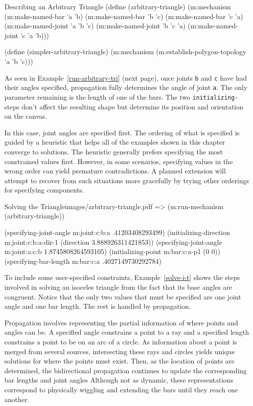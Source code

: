 \begin{code-example}
[label=arbitrary-tri]
{Describing an Arbitrary Triangle}
(define (arbitrary-triangle)
  (m:mechanism
   (m:make-named-bar 'a 'b)
   (m:make-named-bar 'b 'c)
   (m:make-named-bar 'c 'a)
   (m:make-named-joint 'a 'b 'c)
   (m:make-named-joint 'b 'c 'a)
   (m:make-named-joint 'c 'a 'b)))

(define (simpler-arbitrary-triangle)
  (m:mechanism
   (m:establish-polygon-topology 'a 'b 'c)))
\end{code-example}

As seen in Example~\ref{run-arbitrary-tri} (next page), once joints
\texttt{b} and \texttt{c} have had their angles specified, propagation
fully determines the angle of joint \texttt{a}.  The only parameter
remaining is the length of one of the bars.  The two
\texttt{initializing-} steps don't affect the resulting shape but
determine its position and orientation on the canvas.

In this case, joint angles are specified first. The ordering of what
is specified is guided by a heuristic that helps all of the examples
shown in this chapter converge to solutions. The heuristic generally
prefers specifying the most constrained values first. However, in some
scenarios, specifying values in the wrong order can yield premature
contradictions. A planned extension will attempt to recover from such
situations more gracefully by trying other orderings for specifying
components.

\begin{pdf-example}
[label=run-arbitrary-tri]
{Solving the Triangle}{images/arbitrary-triangle.pdf}
=> (m:run-mechanism (arbitrary-triangle))

(specifying-joint-angle m:joint:c:b:a .41203408293499)
(initializing-direction m:joint:c:b:a-dir-1 (direction 3.888926311421853))
(specifying-joint-angle m:joint:a:c:b 1.8745808264593105)
(initializing-point m:bar:c:a-p1 (0 0))
(specifying-bar-length m:bar:c:a .4027149730292784)
\end{pdf-example}

To include some user-specified constraints, Example~\ref{solve-i-t}
shows the steps involved in solving an isoceles triangle from the fact
that its base angles are congruent. Notice that the only two values
that must be specified are one joint angle and one bar length. The
rest is handled by propagation.

Propagation involves representing the partial information of where
points and angles can be. A specified angle constrains a point to a
ray and a specified length constrains a point to be on an arc of a
circle. As information about a point is merged from several sources,
intersecting these rays and circles yields unique solutions for where
the points must exist. Then, as the location of points are determined,
the bidirectional propagation continues to update the corresponding
bar lengths and joint angles Although not as dynamic, these
representations correspond to physically wiggling and extending the
bars until they reach one another.

